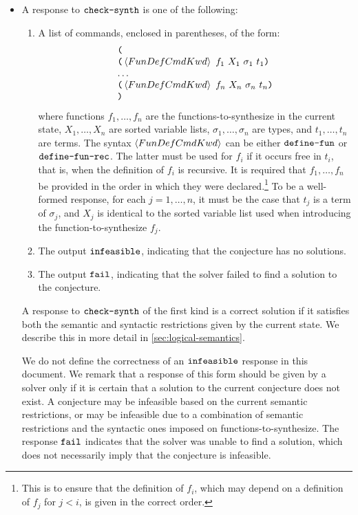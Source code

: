 \documentclass[english,a4paper,10pt]{article}
\begin{document}
\begin{itemize}
\item
A response to $\texttt{check-synth}$ is one of the following:

\begin{enumerate}
\item
A list of commands, enclosed in parentheses, of the form:
\[
\begin{array}{l}
\texttt{(}\\
\texttt{(}\left\langle FunDefCmdKwd\right\rangle\mbox{ }f_{1}\mbox{ }X_{1}\mbox{ }\sigma_{1}\mbox{ }t_{1}\texttt{)}\\
\ldots\\
\texttt{(}\left\langle FunDefCmdKwd\right\rangle\mbox{ }f_{n}\mbox{ }X_{n}\mbox{ }\sigma_{n}\mbox{ }t_{n}\texttt{)}\\
\texttt{)}
\end{array}
\]
where functions $f_{1}, \ldots, f_{n}$
are the functions-to-synthesize in the current state,
$X_{1}, \ldots, X_{n}$ are sorted variable lists,
$\sigma_{1}, \ldots, \sigma_{n}$ are types,
and $t_{1}, \ldots, t_{n}$ are terms.
The syntax $\left\langle FunDefCmdKwd\right\rangle$ can be either $\texttt{define-fun}$ or $\texttt{define-fun-rec}$.
The latter must be used for $f_i$ if it occurs free in $t_i$,
that is, when the definition of $f_i$ is recursive.
It is required that $f_1, \ldots, f_n$ be
provided in the order in which they were declared.\footnote{
This is to ensure that the definition of $f_i$, which may depend on a definition
of $f_j$ for $j<i$, is given in the correct order.
}
To be a well-formed response, 
for each $j=1, \ldots, n$, it must be the case that
$t_{j}$ is a term of $\sigma_{j}$,
and $X_{j}$ is identical to the sorted variable list
used when introducing the function-to-synthesize $f_{j}$.

\item
The output ${\tt infeasible}$,
indicating that the conjecture has no solutions.

\item
The output ${\tt fail}$,
indicating that the solver failed to find a solution to the conjecture.

\end{enumerate}

A response to $\texttt{check-synth}$ of the first kind is a correct solution if
it satisfies both the semantic and syntactic restrictions given by
the current state.
We describe this in more detail in \cref{sec:logical-semantics}.

We do not define the correctness of an ${\tt infeasible}$ response 
in this document. 
We remark that a response of this form should be given
by a solver only if it is certain that a solution to the current
conjecture does not exist.
A conjecture may be infeasible based on the current semantic
restrictions, or may be infeasible due to a combination
of semantic restrictions and the syntactic ones imposed on functions-to-synthesize.
The response ${\tt fail}$ indicates that the solver
was unable to find a solution, which does not necessarily imply that
the conjecture is infeasible.


\end{itemize}
\end{document}
